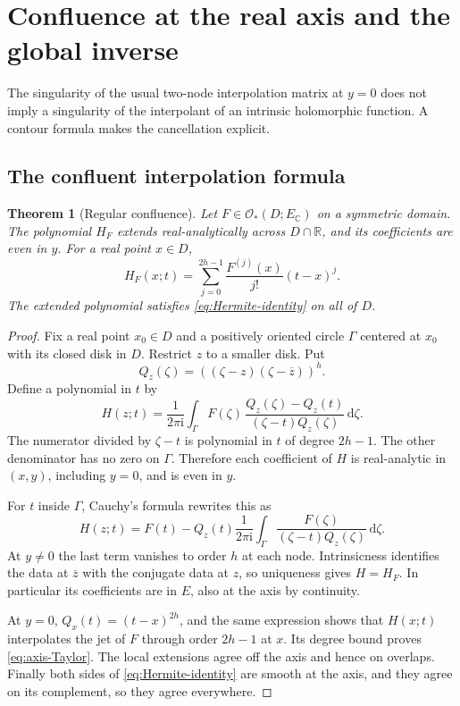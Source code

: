 \documentclass[11pt,a4paper]{article}
\numberwithin{equation}{section}
\newtheorem{theorem}{Theorem}[section]
\theoremstyle{definition}
\theoremstyle{remark}
\newcommand{\R}{\mathbb R}
\newcommand{\C}{\mathbb C}
\newcommand{\ii}{\mathrm i}
\newcommand{\dd}{\,\mathrm d}
\newcommand{\Hol}{\mathcal O}
\newcommand{\barz}{\overline z}
\begin{document}
\section{Confluence at the real axis and the global inverse}
\label{sec:axis}

The singularity of the usual two-node interpolation matrix at $y=0$ does not
imply a singularity of the interpolant of an intrinsic holomorphic function.
A contour formula makes the cancellation explicit.

\subsection{The confluent interpolation formula}

\begin{theorem}[Regular confluence]\label{thm:confluence}
Let $F\in\Hol_*(D;E_\C)$ on a symmetric domain. The polynomial $H_F$ extends
real-analytically across $D\cap\R$, and its coefficients are even in $y$.
For a real point $x\in D$,
\begin{equation}\label{eq:axis-Taylor}
 H_F(x;t)=\sum_{j=0}^{2h-1}\frac{F^{(j)}(x)}{j!}(t-x)^j.
\end{equation}
The extended polynomial satisfies \eqref{eq:Hermite-identity} on all of $D$.
\end{theorem}
\begin{proof}
Fix a real point $x_0\in D$ and a positively oriented circle $\Gamma$ centered
at $x_0$ with its closed disk in $D$. Restrict $z$ to a smaller disk. Put
\[
 Q_z(\zeta)=((\zeta-z)(\zeta-\barz))^h.
\]
Define a polynomial in $t$ by
\begin{equation}\label{eq:contour-H}
 H(z;t)=\frac1{2\pi\ii}\int_\Gamma
 F(\zeta)\,
 \frac{Q_z(\zeta)-Q_z(t)}{(\zeta-t)Q_z(\zeta)}\dd\zeta.
\end{equation}
The numerator divided by $\zeta-t$ is polynomial in $t$ of degree $2h-1$.
The other denominator has no zero on $\Gamma$. Therefore each coefficient
of $H$ is real-analytic in $(x,y)$, including $y=0$, and is even in $y$.

For $t$ inside $\Gamma$, Cauchy's formula rewrites this as
\[
 H(z;t)=F(t)-Q_z(t)\frac1{2\pi\ii}
          \int_\Gamma\frac{F(\zeta)}{(\zeta-t)Q_z(\zeta)}\dd\zeta.
\]
At $y\ne0$ the last term vanishes to order $h$ at each node. Intrinsicness
identifies the data at $\barz$ with the conjugate data at $z$, so uniqueness
gives $H=H_F$. In particular its coefficients are in $E$, also at the axis
by continuity.

At $y=0$, $Q_x(t)=(t-x)^{2h}$, and the same expression shows that $H(x;t)$
interpolates the jet of $F$ through order $2h-1$ at $x$. Its degree bound
proves \eqref{eq:axis-Taylor}. The local extensions agree off the axis and
hence on overlaps. Finally both sides of \eqref{eq:Hermite-identity} are
smooth at the axis, and they agree on its complement, so they agree everywhere.
\end{proof}
\end{document}
